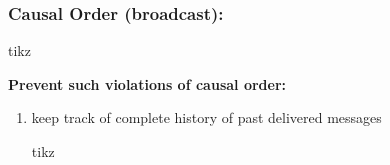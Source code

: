 \documentclass{article}
\begin{document}
\begin{adjustwidth}{2em}{2em}
\begin{adjustwidth}{2em}{2em}
			\subsubsection{Causal Order (broadcast):}
			\begin{center}
				tikz
			\end{center}
			\begin{adjustwidth}{2em}{}
				\textbf{Prevent such violations of causal order:}
				\begin{enumerate}[-]
					\item keep track of complete history of past delivered messages
					\begin{center}
						tikz
					\end{center}
				\end{enumerate}
			\end{adjustwidth}
		\end{adjustwidth}
	\end{adjustwidth}
	
	\newpage
	
\end{document}
